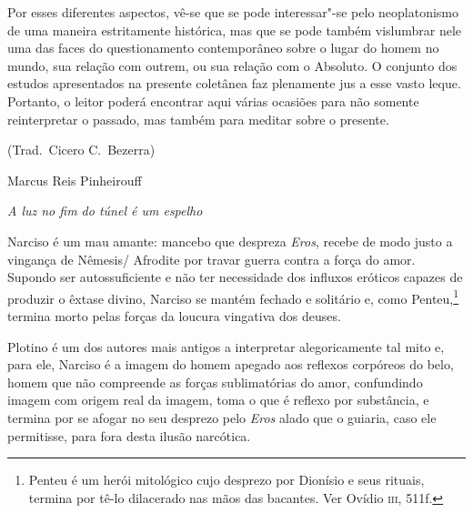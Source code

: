Por esses diferentes aspectos, vê-se que se pode interessar"-se
pelo neoplatonismo de uma maneira estritamente histórica, mas que se
pode também vislumbrar nele uma das faces do questionamento
contemporâneo sobre o lugar do homem no mundo, sua relação com
outrem, ou sua relação com o Absoluto. O conjunto dos estudos
apresentados na presente coletânea faz plenamente jus a esse vasto
leque. Portanto, o leitor poderá encontrar aqui várias ocasiões para não
somente reinterpretar o passado, mas também para meditar sobre o
presente.\\\bigskip

\hfill (Trad.~Cicero C.~Bezerra)


%
	{Marcus Reis Pinheiro}{uff}

\epigraph{\hfill{}\emph{A luz no fim do túnel é um espelho}}{}

Narciso é um mau amante: mancebo que despreza \emph{Eros},
recebe de modo justo a vingança de Nêmesis/ Afrodite por travar
guerra contra a força do amor. Supondo ser autossuficiente e não ter
necessidade dos influxos eróticos capazes de produzir o êxtase
divino, Narciso se mantém fechado e solitário e, como
Penteu,\footnote{ Penteu é um herói mitológico cujo desprezo por
Dionísio e seus rituais, termina por tê-lo dilacerado nas mãos das
bacantes. Ver Ovídio \textsc{iii}, 511f.} termina morto
pelas forças da loucura vingativa dos deuses.

Plotino é um dos autores mais antigos a interpretar alegoricamente
tal mito e, para ele, Narciso é a imagem do homem apegado aos
reflexos corpóreos do belo, homem que não compreende as forças
sublimatórias do amor, confundindo imagem com origem real da imagem,
toma o que é reflexo por substância, e termina por se afogar no seu
desprezo pelo \emph{Eros} alado que o guiaria, caso ele permitisse,
para fora desta ilusão narcótica.

